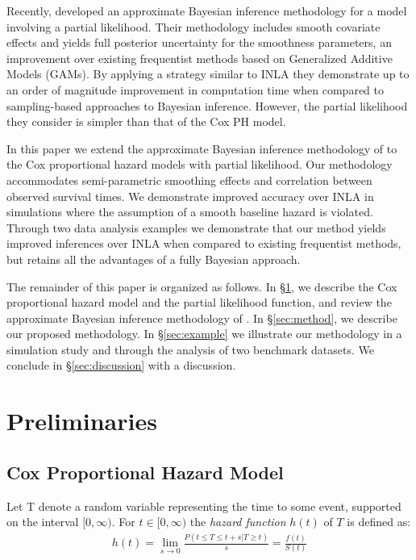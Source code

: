 \documentclass[]{article}
\begin{document}
Recently, \citet{casecross} developed an approximate Bayesian inference methodology for a model involving a partial likelihood. Their methodology includes smooth covariate effects and yields full posterior uncertainty for the smoothness parameters, an improvement over existing frequentist methods based on Generalized Additive Models (GAMs). By applying a strategy similar to INLA they demonstrate up to an order of magnitude improvement in computation time when compared to sampling-based approaches to Bayesian inference. However, the partial likelihood they consider is simpler than that of the Cox PH model.

In this paper we extend the approximate Bayesian inference methodology of \citet{casecross} to the Cox proportional hazard models with partial likelihood. Our methodology accommodates semi-parametric smoothing effects and correlation between observed survival times. We demonstrate improved accuracy over INLA in simulations where the assumption of a smooth baseline hazard is violated. Through two data analysis examples we demonstrate that our method yields improved inferences over INLA when compared to existing frequentist methods, but retains all the advantages of a fully Bayesian approach.

The remainder of this paper is organized as follows. In \S\ref{sec:prelim}, we describe the Cox proportional hazard model and the partial likelihood function, and review the approximate Bayesian inference methodology of \citet{casecross}. In \S\ref{sec:method}, we describe our proposed methodology. In \S\ref{sec:example} we illustrate our methodology in a simulation study and through the analysis of two benchmark datasets. We conclude in \S\ref{sec:discussion} with a discussion.



\section{Preliminaries}\label{sec:prelim}
\subsection{Cox Proportional Hazard Model}
Let T denote a random variable representing the time to some event, supported on the interval $[0,\infty)$. For $t\in[0,\infty)$ the \textit{hazard function} $h(t)$ of $T$ is defined as:
\begin{equation}\begin{aligned}\label{eqn:hazard}
h(t) = \lim_{s\to 0} \frac{P(t\le T \le t+s |T\ge t)}{s} = \frac{f(t)}{S(t)}
\end{aligned}\end{equation}
\end{document}
